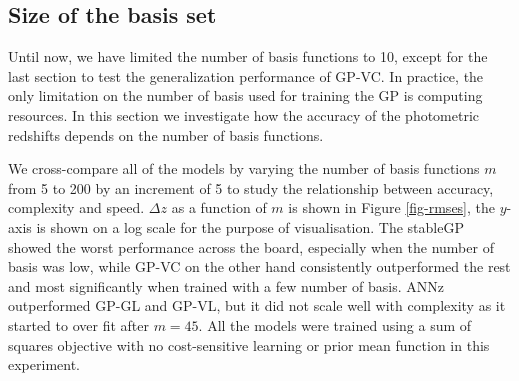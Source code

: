 \documentclass[useAMS,usenatbib,fleqn]{mn2e}
\begin{document}
\subsection{Size of the basis set}

Until now, we have limited the number of basis functions to 10, except for the last section to test the generalization performance of GP-VC. In practice, the only limitation on the number of basis used for training the GP is computing resources. In this section we investigate how the accuracy of the photometric redshifts depends on the number of basis functions.

We cross-compare all of the models by varying the number of basis functions $m$ from 5 to 200 by an increment of 5 to study the relationship between accuracy, complexity and speed. $\Delta z$ as a function of $m$ is shown in Figure \ref{fig-rmses}, the $y$-axis is shown on a log scale for the purpose of visualisation. The stableGP showed the worst performance across the board, especially when the number of basis was low, while GP-VC on the other hand consistently outperformed the rest and most significantly when trained with a few number of basis. ANNz outperformed GP-GL and GP-VL, but it did not scale well with complexity as it started to over fit after $m=45$. All the models were trained using a sum of squares objective with no cost-sensitive learning or prior mean function in this experiment. 
\end{document}

